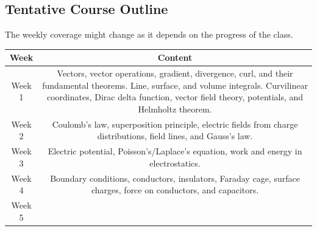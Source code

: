 \documentclass[11pt]{article}
\begin{document}
\subsection*{Tentative Course Outline}
The weekly coverage might change as it depends on the progress of the class. 
\begin{table}[h!]
\normalsize %
\begin{tabular}{ | c | c | }
\hline
\textbf{Week} & \textbf{Content} \\
\hline
Week 1 & \begin{minipage}{.85\textwidth}

	\vspace{1mm}
    Vectors, vector operations, gradient, divergence, curl, and their fundamental theorems. Line, surface, and volume integrals. Curvilinear coordinates, Dirac delta function, vector field theory, potentials, and Helmholtz theorem.
	\vspace{1mm}

\end{minipage} \\
\hline
Week 2 & \begin{minipage}{.85\textwidth}

	\vspace{1mm}
	Coulomb’s law, superposition principle, electric fields from charge distributions, field lines, and Gauss’s law.
	\vspace{1mm}

\end{minipage} \\
\hline
Week 3 & \begin{minipage}{.85\textwidth}

	\vspace{1mm}
	Electric potential, Poisson’s/Laplace’s equation, work and energy in electrostatics.
	\vspace{1mm}

\end{minipage} \\
\hline
Week 4 & \begin{minipage}{.85\textwidth}

	\vspace{1mm}
    Boundary conditions, conductors, insulators, Faraday cage, surface charges, force on conductors, and capacitors. 
	\vspace{1mm}

\end{minipage} \\
\hline
Week 5 & \begin{minipage}{.85\textwidth}


\end{minipage}
\end{tabular}
\end{table}
\end{document}
